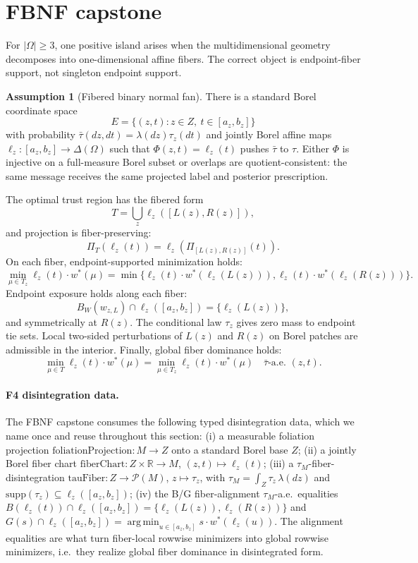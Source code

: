 \documentclass[11pt]{article}
\theoremstyle{definition}
\newtheorem{assumption}{Assumption}
\theoremstyle{remark}
\newcommand{\R}{\mathbb{R}}
\newcommand{\Om}{\Omega}
\newcommand{\argmin}{\operatorname*{arg\,min}}
\begin{document}
\section{FBNF capstone}\label{sec:fbnf}

For $|\Om|\ge3$, one positive island arises when the multidimensional geometry decomposes into one-dimensional affine fibers. The correct object is endpoint-fiber support, not singleton endpoint support.

\begin{assumption}[Fibered binary normal fan]
There is a standard Borel coordinate space
\[
  E=\{(z,t):z\in Z,\ t\in[a_z,b_z]\}
\]
with probability $\bar\tau(dz,dt)=\lambda(dz)\tau_z(dt)$ and jointly Borel affine maps $\ell_z:[a_z,b_z]\to\Delta(\Om)$ such that $\Phi(z,t)=\ell_z(t)$ pushes $\bar\tau$ to $\tau$. Either $\Phi$ is injective on a full-measure Borel subset or overlaps are quotient-consistent: the same message receives the same projected label and posterior prescription.

The optimal trust region has the fibered form
\[
  T=\bigcup_z \ell_z([L(z),R(z)]),
\]
and projection is fiber-preserving:
\[
  \Pi_T(\ell_z(t))=\ell_z(\Pi_{[L(z),R(z)]}(t)).
\]
On each fiber, endpoint-supported minimization holds:
\[
  \min_{\mu\in T_z}\ell_z(t)\cdot w^*(\mu)
  =\min\{\ell_z(t)\cdot w^*(\ell_z(L(z))),
          \ell_z(t)\cdot w^*(\ell_z(R(z)))\}.
\]
Endpoint exposure holds along each fiber:
\[
  B_W(w_{z,L})\cap\ell_z([a_z,b_z])=\{\ell_z(L(z))\},
\]
and symmetrically at $R(z)$. The conditional law $\tau_z$ gives zero mass to endpoint tie sets. Local two-sided perturbations of $L(z)$ and $R(z)$ on Borel patches are admissible in the interior. Finally, global fiber dominance holds:
\[
  \min_{\mu\in T}\ell_z(t)\cdot w^*(\mu)
  =\min_{\mu\in T_z}\ell_z(t)\cdot w^*(\mu)
  \quad \bar\tau\text{-a.e. }(z,t).
\]
\end{assumption}

\paragraph{F4 disintegration data.} The FBNF capstone consumes the following typed disintegration data, which we name once and reuse throughout this section: (i) a measurable foliation projection $\mathrm{foliationProjection}:M\to Z$ onto a standard Borel base $Z$; (ii) a jointly Borel fiber chart $\mathrm{fiberChart}:Z\times\R\to M$, $(z,t)\mapsto\ell_z(t)$; (iii) a $\tau_M$-fiber-disintegration $\mathrm{tauFiber}:Z\to\mathcal P(M)$, $z\mapsto\tau_z$, with $\tau_M=\int_Z\tau_z\,\lambda(dz)$ and $\mathrm{supp}(\tau_z)\subseteq\ell_z([a_z,b_z])$; (iv) the B/G fiber-alignment $\tau_M$-a.e.\ equalities $B(\ell_z(t))\cap\ell_z([a_z,b_z])=\{\ell_z(L(z)),\ell_z(R(z))\}$ and $G(s)\cap\ell_z([a_z,b_z])=\argmin_{u\in[a_z,b_z]}s\cdot w^*(\ell_z(u))$. The alignment equalities are what turn fiber-local rowwise minimizers into global rowwise minimizers, i.e.\ they realize global fiber dominance in disintegrated form.
\end{document}
